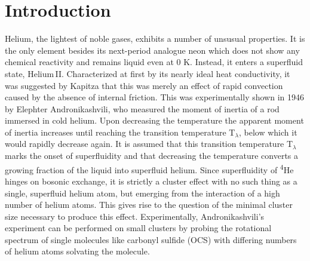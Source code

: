 \documentclass[12pt,titlepage]{article}
\begin{document}
\newcommand{\icm}{\,cm\textsuperscript{-1}}

\begin{titlepage}
	\centering
	\maketitle

\end{titlepage}

\section{Introduction}
\label{introduction}
Helium, the lightest of noble gases, exhibits a number of unsusual properties. It is the only element besides its next-period analogue neon which does not show any chemical reactivity and remains liquid even at 0 K. Instead, it enters a superfluid state, Helium\,II. Characterized at first by its nearly ideal heat conductivity, it was suggested by Kapitza that this was merely an effect of rapid convection caused by the absence of internal friction\cite{Kapitza1938}. This was experimentally shown in 1946 by Elephter Andronikashvili, who measured the moment of inertia of a rod immersed in cold helium. Upon decreasing the temperature the apparent moment of inertia increases until reaching the transition temperature T$_{\lambda}$, below which it would rapidly decrease again. It is assumed that this transition temperature T$_{\lambda}$ marks the onset of superfluidity and that decreasing the temperature converts a growing fraction of the liquid into superfluid helium.
Since superfluidity of \textsuperscript{4}He hinges on bosonic exchange\cite{LONDON1938,Wyatt1998}, it is strictly a cluster effect with no such thing as a single, superfluid helium atom, but emerging from the interaction of a high number of helium atoms. This gives rise to the question of the minimal cluster size necessary to produce this effect. Experimentally, Andronikashvili's experiment can be performed on small clusters by probing the rotational spectrum of single molecules like carbonyl sulfide (OCS)\cite{Grebenev1998} with differing numbers of helium atoms solvating the molecule.\\
\end{document}
